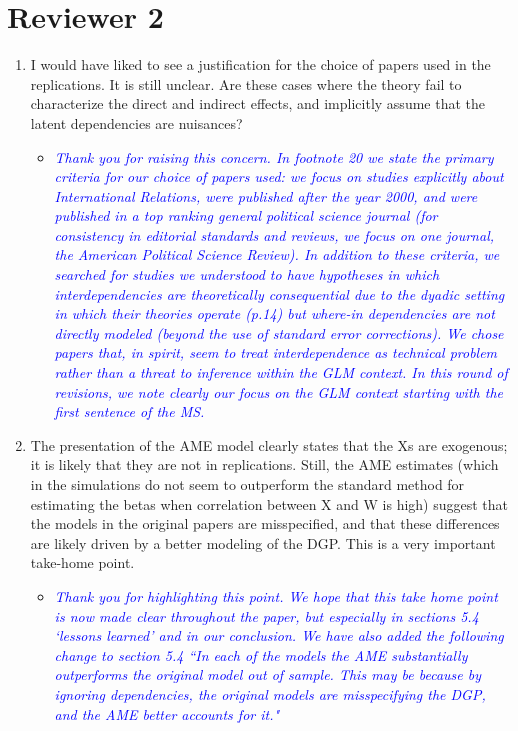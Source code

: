 \section*{Reviewer 2}

\begin{enumerate}
	\item I would have liked to see a justification for the choice of papers used in the replications. It is still unclear. Are these cases where the theory fail to characterize the direct and indirect effects, and implicitly assume that the latent dependencies are nuisances?
	\begin{itemize}
		\item \textcolor{blue}{ \emph{
		Thank you for raising this concern. In footnote 20 we state the primary criteria for our choice of papers used: we focus on studies explicitly about International Relations, were published after the year 2000, and were published in a top ranking general political science journal (for consistency in editorial standards and reviews, we focus on one journal, the American Political Science Review). In addition to these criteria, we searched for studies we understood to have hypotheses in which interdependencies are theoretically consequential due to the dyadic setting in which their theories operate (p.14) but where-in dependencies are not directly modeled (beyond the use of standard error corrections). We chose papers that, in spirit, seem to treat interdependence as technical problem rather than a threat to inference within the GLM context. In this round of revisions, we note clearly our focus on the GLM context starting with the first sentence of the MS.}}
	\end{itemize}
	\item The presentation of the AME model clearly states that the Xs are exogenous; it is likely that they are not in replications. Still, the AME estimates (which in the simulations do not seem to outperform the standard method for estimating the betas when correlation between X and W is high) suggest that the models in the original papers are misspecified, and that these differences are likely driven by a better modeling of the DGP. This is a very important take-home point.
	\begin{itemize}
		\item \textcolor{blue}{ \emph{
			Thank you for highlighting this point. We hope that this take home point is now made clear throughout the paper, but especially in sections 5.4 `lessons learned' and in our conclusion. We have also added the following change to section 5.4 ``In each of the models the AME substantially outperforms the original model out of sample. This may be because by ignoring dependencies, the original models are misspecifying the DGP, and the AME better accounts for it."
			}}
	\end{itemize}
\end{enumerate}